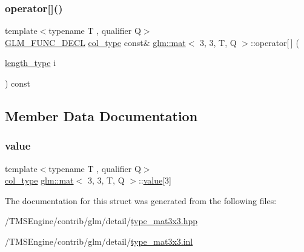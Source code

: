 \mbox{\label{structglm_1_1mat_3_013_00_013_00_01_t_00_01_q_01_4_abce9d671a13bf9f9a315b7f8b5042617}} 
\subsubsection{\texorpdfstring{operator[]()}{operator[]()}\hspace{0.1cm}{\footnotesize\ttfamily [2/2]}}
{\footnotesize\ttfamily template$<$typename T , qualifier Q$>$ \\
\hyperlink{setup_8hpp_ab2d052de21a70539923e9bcbf6e83a51}{G\+L\+M\+\_\+\+F\+U\+N\+C\+\_\+\+D\+E\+CL} \hyperlink{structglm_1_1mat_3_013_00_013_00_01_t_00_01_q_01_4_a4d84bef3685131dbb0ac43cac0a3b147}{col\+\_\+type} const\& \hyperlink{structglm_1_1mat}{glm\+::mat}$<$ 3, 3, T, Q $>$\+::operator\mbox{[}$\,$\mbox{]} (\begin{DoxyParamCaption}\item[{\hyperlink{structglm_1_1mat_3_013_00_013_00_01_t_00_01_q_01_4_ae1b8524f20936516a48384a2841b5b9d}{length\+\_\+type}}]{i }\end{DoxyParamCaption}) const}



\subsection{Member Data Documentation}
\mbox{\label{structglm_1_1mat_3_013_00_013_00_01_t_00_01_q_01_4_a505193d8cb434f9d92dafb3108e39452}} 
\subsubsection{\texorpdfstring{value}{value}}
{\footnotesize\ttfamily template$<$typename T , qualifier Q$>$ \\
\hyperlink{structglm_1_1mat_3_013_00_013_00_01_t_00_01_q_01_4_a4d84bef3685131dbb0ac43cac0a3b147}{col\+\_\+type} \hyperlink{structglm_1_1mat}{glm\+::mat}$<$ 3, 3, T, Q $>$\+::\hyperlink{_s_d_l__opengl__glext_8h_a8ad81492d410ff2ac11f754f4042150f}{value}\mbox{[}3\mbox{]}\hspace{0.3cm}{\ttfamily [private]}}



The documentation for this struct was generated from the following files\+:\begin{DoxyCompactItemize}
\item 
/\+T\+M\+S\+Engine/contrib/glm/detail/\hyperlink{type__mat3x3_8hpp}{type\+\_\+mat3x3.\+hpp}\item 
/\+T\+M\+S\+Engine/contrib/glm/detail/\hyperlink{type__mat3x3_8inl}{type\+\_\+mat3x3.\+inl}\end{DoxyCompactItemize}
